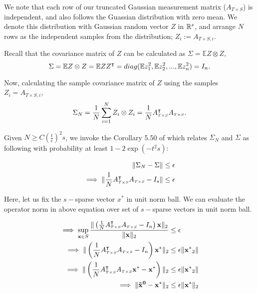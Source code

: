We note that each row of our truncated Gaussian measurement matrix ($A_{\scriptscriptstyle{T\times S}}$) is independent, and also follows the Guassian distribution with zero mean.  
We denote this distribution with Gaussian random vector $Z$ in ${\mathbb{R}}^s$, and arrange $N$ rows as the independent samples from the distribution; $Z_i := A_{\scriptscriptstyle{T\times S},i}$. 

Recall that the covariance matrix of $Z$ can be calculated as $\Sigma = \mathbb{E}Z\otimes Z$,
$$
\Sigma= \mathbb{E}Z\otimes Z = \mathbb{E} ZZ^\intercal = diag(\mathbb{E}z_1^2,\mathbb{E}z_2^2,...,\mathbb{E}z_n^2) = I_n.
$$

Now, calculating the sample covariance matrix of $Z$ using the samples $Z_i = A_{\scriptscriptstyle{T\times S},i}$,
$$
\Sigma_N = \frac{1}{N}\sum_{i=1}^{N}Z_i \otimes Z_i = \frac{1}{N} A_{\scriptscriptstyle{T\times S}}^\intercal A_{\scriptscriptstyle{T\times S}}.
$$

Given $N \geq C(\frac{t}{\epsilon})^2s$, we invoke the Corollary 5.50 of \cite{}  which relates $\Sigma_N$ and $\Sigma$ as following with probability at least $1 - 2\exp\left(-t^2s\right)$:

\begin{align*}
\|\Sigma_N - \Sigma\| &\leq \epsilon \\
\implies \|\frac{1}{N} A_{\scriptscriptstyle{T\times S}}^\intercal A_{\scriptscriptstyle{T\times S}} - I_s\| &\leq \epsilon \\
\end{align*}

Here, let us fix the $s-$sparse vector $x^*$ in unit norm ball. We can evaluate the operator norm in above equation over set of $s-$sparse vectors in unit norm ball.

\begin{align*}
\implies \sup_{\mathbf{x} \in S} \frac{\|\left(\frac{1}{N} A_{\scriptscriptstyle{T\times S}}^\intercal A_{\scriptscriptstyle{T\times S}} - I_n\right)\mathbf{x}\|_2}{\|\mathbf{x}\|_2} &\leq \epsilon \\
\implies \|\left(\frac{1}{N} A_{\scriptscriptstyle{T\times S}}^\intercal A_{\scriptscriptstyle{T\times S}} - I_n\right)\mathbf{x^*}\|_2 &\leq \epsilon \|\mathbf{x^*}_2\| \\
\implies \|\left(\frac{1}{N} A_{\scriptscriptstyle{T\times S}}^\intercal A_{\scriptscriptstyle{T\times S}}\mathbf{x^*} - \mathbf{x^*}\right)\|_2 &\leq \epsilon \|\mathbf{x^*}_2\| \\
\implies \|\mathbf{\tilde{x}^0} - \mathbf{x^*}\|_2 &\leq \epsilon \|\mathbf{x^*}\|_2 \\
\end{align*}

